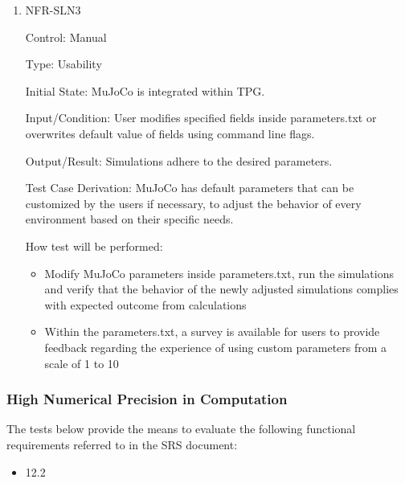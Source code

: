 \documentclass[12pt, titlepage]{article}
\begin{document}
\begin{enumerate}
\item NFR-SLN3

Control: Manual

Type: Usability

Initial State: MuJoCo is integrated within TPG.

Input/Condition: User modifies specified fields inside parameters.txt or overwrites default value of fields using command line flags.

Output/Result: Simulations adhere to the desired parameters.

Test Case Derivation: MuJoCo has default parameters that can be customized by the users if necessary, to adjust the behavior of every environment based on their specific needs.

How test will be performed:
\begin{itemize}
  \item Modify MuJoCo parameters inside parameters.txt, run the simulations and verify that the behavior of the newly adjusted simulations complies with expected outcome from calculations
  \item Within the parameters.txt, a survey is available for users to provide feedback regarding the experience of using custom parameters from a scale of 1 to 10
\end{itemize}

\end{enumerate}

\subsubsection{High Numerical Precision in Computation}

The tests below provide the means to evaluate the following functional requirements referred to in the SRS document:
\begin{itemize}
  \item 12.2
\end{itemize}
\end{document}
